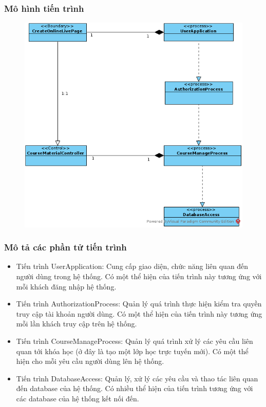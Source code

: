 \documentclass[./../main_file.tex]{subfiles}
\begin{document}
\subsubsection{Mô hình tiến trình}

\begin{figure}[H]
	\centering
	\includegraphics[width=\linewidth]{./images/pv_create_online_live.png}
\end{figure}

\subsubsection{Mô tả các phần tử tiến trình}
\begin{itemize}
	\item Tiến trình UserApplication: Cung cấp giao diện, chức năng liên quan đến người dùng trong hệ thống. Có một thể hiện của tiến trình này tương ứng với mỗi khách đăng nhập hệ thống.
	\item Tiến trình AuthorizationProcess: Quản lý quá trình thực hiện kiểm tra quyền truy cập tài khoản người dùng.
	Có một thể hiện của tiến trình này tương ứng mỗi lần khách truy cập trên hệ thống.
\item Tiến trình CourseManageProcess: Quản lý quá trình xử lý các yêu cầu liên quan tới khóa học (ở đây là tạo một lớp học trực tuyến mới).
	Có một thể hiện cho mỗi yêu cầu người dùng lên hệ thống.
	\item Tiến trình DatabaseAccess: Quản lý, xử lý các yêu cầu và thao tác liên quan đến  database của hệ thống. Có nhiều thể hiện của tiến trình tương ứng với các database của hệ thống kết nối đến.
\end{itemize}
\end{document}
